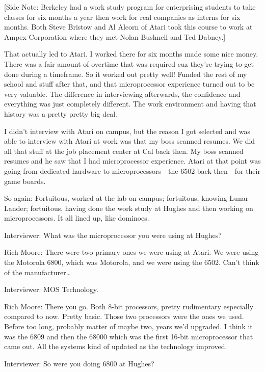 [Side Note: Berkeley had a work study program for enterprising students to take classes for six months a year then work for real companies as interns for six months. Both Steve Bristow and Al Alcorn of Atari took this course to work at Ampex Corporation where they met Nolan Bushnell and Ted Dabney.]

That actually led to Atari. I worked there for six months made some nice money. There was a fair amount of overtime that was required cuz they're trying to get done during a timeframe. So it worked out pretty well! Funded the rest of my school and stuff after that, and that microprocessor experience turned out to be very valuable. The difference in interviewing afterwards, the confidence and everything was just completely different. The work environment and having that history was a pretty pretty big deal.

I didn't interview with Atari on campus, but the reason I got selected and was able to interview with Atari at work was that my boss scanned resumes. We did all that stuff at the job placement center at Cal back then. My boss scanned resumes and he saw that I had microprocessor experience. Atari at that point was going from dedicated hardware to microprocessors - the 6502 back then - for their game boards.

So again: Fortuitous, worked at the lab on campus; fortuitous, knowing Lunar Lander; fortuitous, having done the work study at Hughes and then working on microprocessors. It all lined up, like dominoes.

\textcolor{interviewer}{Interviewer:} What was the microprocessor you were using at Hughes?

\textcolor{interviewee}{Rich Moore:} There were two primary ones we were using at Atari. We were using the Motorola 6800, which was Motorola, and we were using the 6502. Can’t think of the manufacturer…

\textcolor{interviewer}{Interviewer:} MOS Technology.

\textcolor{interviewee}{Rich Moore:} There you go. Both 8-bit processors, pretty rudimentary especially compared to now. Pretty basic. Those two processors were the ones we used. Before too long, probably matter of maybe two, years we'd upgraded. I think it was the 6809 and then the 68000 which was the first 16-bit microprocessor that came out. All the systems kind of updated as the technology improved.

\textcolor{interviewer}{Interviewer:} So were you doing 6800 at Hughes?

